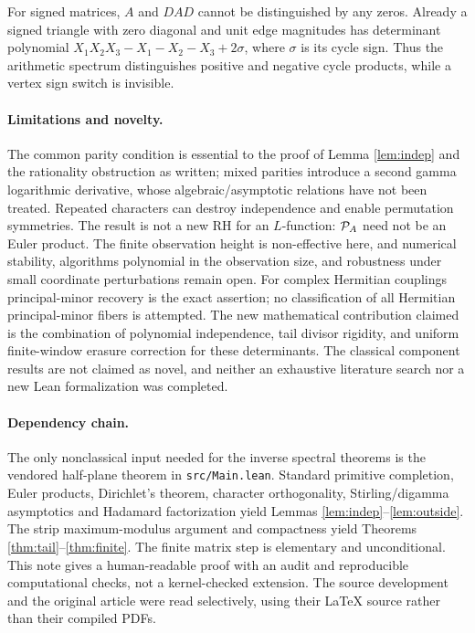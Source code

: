 \documentclass[11pt]{article}
\theoremstyle{definition}\newtheorem{definition}[theorem]{Definition}
\begin{document}
For signed matrices, $A$ and $DAD$ cannot be distinguished by any zeros. Already a signed triangle with zero diagonal and unit edge magnitudes has determinant polynomial $X_1X_2X_3-X_1-X_2-X_3+2\sigma$, where $\sigma$ is its cycle sign. Thus the arithmetic spectrum distinguishes positive and negative cycle products, while a vertex sign switch is invisible.

\paragraph{Limitations and novelty.} The common parity condition is essential to the proof of Lemma \ref{lem:indep} and the rationality obstruction as written; mixed parities introduce a second gamma logarithmic derivative, whose algebraic/asymptotic relations have not been treated. Repeated characters can destroy independence and enable permutation symmetries. The result is not a new RH for an $L$-function: $\mathcal P_A$ need not be an Euler product. The finite observation height is non-effective here, and numerical stability, algorithms polynomial in the observation size, and robustness under small coordinate perturbations remain open. For complex Hermitian couplings principal-minor recovery is the exact assertion; no classification of all Hermitian principal-minor fibers is attempted. The new mathematical contribution claimed is the combination of polynomial independence, tail divisor rigidity, and uniform finite-window erasure correction for these determinants. The classical component results are not claimed as novel, and neither an exhaustive literature search nor a new Lean formalization was completed.

\paragraph{Dependency chain.} The only nonclassical input needed for the inverse spectral theorems is the vendored half-plane theorem in \texttt{src/Main.lean}. Standard primitive completion, Euler products, Dirichlet's theorem, character orthogonality, Stirling/digamma asymptotics and Hadamard factorization yield Lemmas \ref{lem:indep}--\ref{lem:outside}. The strip maximum-modulus argument and compactness yield Theorems \ref{thm:tail}--\ref{thm:finite}. The finite matrix step is elementary and unconditional. This note gives a human-readable proof with an audit and reproducible computational checks, not a kernel-checked extension. The source development and the original article were read selectively, using their LaTeX source rather than their compiled PDFs.
\end{document}
